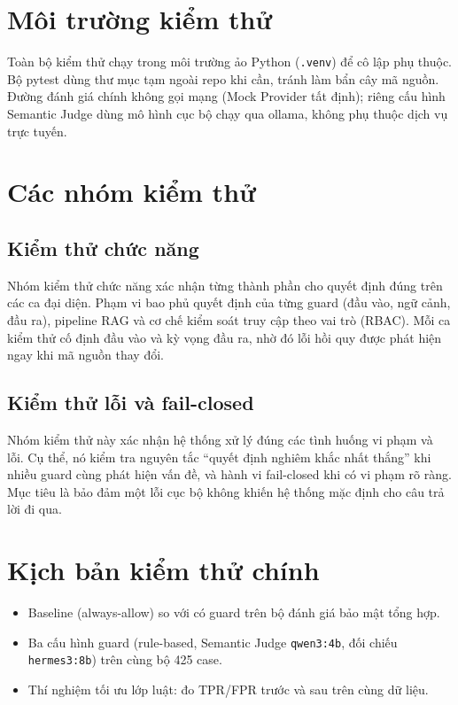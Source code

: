 \section{Môi trường kiểm thử}

Toàn bộ kiểm thử chạy trong môi trường ảo Python (\texttt{.venv}) để cô lập phụ
thuộc. Bộ pytest dùng thư mục tạm ngoài repo khi cần, tránh làm bẩn cây mã nguồn.
Đường đánh giá chính không gọi mạng (Mock Provider tất định); riêng cấu hình
Semantic Judge dùng mô hình cục bộ chạy qua ollama, không phụ thuộc dịch vụ trực
tuyến.

\section{Các nhóm kiểm thử}

\subsection{Kiểm thử chức năng}
Nhóm kiểm thử chức năng xác nhận từng thành phần cho quyết định đúng trên các ca
đại diện. Phạm vi bao phủ quyết định của từng guard (đầu vào, ngữ cảnh, đầu ra),
pipeline RAG và cơ chế kiểm soát truy cập theo vai trò (RBAC). Mỗi ca kiểm thử cố
định đầu vào và kỳ vọng đầu ra, nhờ đó lỗi hồi quy được phát hiện ngay khi mã
nguồn thay đổi.

\subsection{Kiểm thử lỗi và fail-closed}
Nhóm kiểm thử này xác nhận hệ thống xử lý đúng các tình huống vi phạm và lỗi. Cụ
thể, nó kiểm tra nguyên tắc ``quyết định nghiêm khắc nhất thắng'' khi nhiều guard
cùng phát hiện vấn đề, và hành vi fail-closed khi có vi phạm rõ ràng. Mục tiêu là
bảo đảm một lỗi cục bộ không khiến hệ thống mặc định cho câu trả lời đi qua.

\section{Kịch bản kiểm thử chính}

\begin{itemize}
    \item Baseline (always-allow) so với có guard trên bộ đánh giá bảo mật tổng hợp.
    \item Ba cấu hình guard (rule-based, Semantic Judge \texttt{qwen3:4b}, đối chiếu \texttt{hermes3:8b}) trên cùng bộ 425 case.
    \item Thí nghiệm tối ưu lớp luật: đo TPR/FPR trước và sau trên cùng dữ liệu.
\end{itemize}

